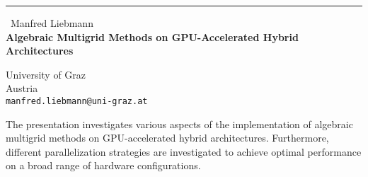 \documentclass{report}
\begin{document}
\begin{center}
\rule{6in}{1pt} \
{\large Manfred Liebmann \\
{\bf Algebraic Multigrid Methods on GPU-Accelerated Hybrid Architectures}}

University of Graz \\ Austria
\\
{\tt manfred.liebmann@uni-graz.at}\end{center}

The presentation investigates various aspects of the implementation of
algebraic multigrid methods on GPU-accelerated hybrid architectures.
Furthermore, different parallelization strategies are investigated to
achieve optimal performance on a broad range of hardware configurations.
\end{document}
